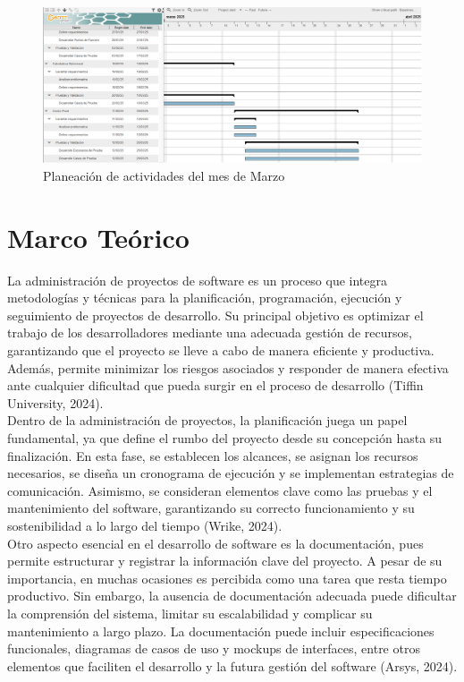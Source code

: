 \documentclass[12pt,letterpaper,spanish, xcolor=table]{report}
\numberwithin{figure}{subsection}
\begin{document}
	\begin{figure}[H]
		\centering
		\includegraphics[width=1.0\textwidth]
		{Imagenes/Planeacion/Mar.png}
		\caption{Planeación de actividades del mes de Marzo
		}\label{a2}
	\end{figure}


	
\chapter{Marco Teórico}
\newpage

La administración de proyectos de software es un proceso que integra metodologías y técnicas para la planificación, programación, ejecución y seguimiento de proyectos de desarrollo. Su principal objetivo es optimizar el trabajo de los desarrolladores mediante una adecuada gestión de recursos, garantizando que el proyecto se lleve a cabo de manera eficiente y productiva. Además, permite minimizar los riesgos asociados y responder de manera efectiva ante cualquier dificultad que pueda surgir en el proceso de desarrollo (Tiffin University, 2024). \\

Dentro de la administración de proyectos, la planificación juega un papel fundamental, ya que define el rumbo del proyecto desde su concepción hasta su finalización. En esta fase, se establecen los alcances, se asignan los recursos necesarios, se diseña un cronograma de ejecución y se implementan estrategias de comunicación. Asimismo, se consideran elementos clave como las pruebas y el mantenimiento del software, garantizando su correcto funcionamiento y su sostenibilidad a lo largo del tiempo (Wrike, 2024).\\

Otro aspecto esencial en el desarrollo de software es la documentación, pues permite estructurar y registrar la información clave del proyecto. A pesar de su importancia, en muchas ocasiones es percibida como una tarea que resta tiempo productivo. Sin embargo, la ausencia de documentación adecuada puede dificultar la comprensión del sistema, limitar su escalabilidad y complicar su mantenimiento a largo plazo. La documentación puede incluir especificaciones funcionales, diagramas de casos de uso y mockups de interfaces, entre otros elementos que faciliten el desarrollo y la futura gestión del software (Arsys, 2024).\\
\end{document}
